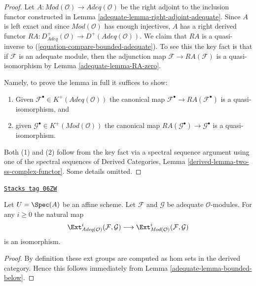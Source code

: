 \begin{proof}

Let $A : \textit{Mod}(\mathcal{O}) \to \textit{Adeq}(\mathcal{O})$
be the right adjoint to the inclusion functor constructed in
Lemma \ref{adequate-lemma-right-adjoint-adequate}.
Since $A$ is left exact and since $\textit{Mod}(\mathcal{O})$
has enough injectives, $A$ has a right derived functor
$RA : D^+_{\textit{Adeq}}(\mathcal{O}) \to D^+(\textit{Adeq}(\mathcal{O}))$.
We claim that $RA$ is a quasi-inverse to
(\ref{equation-compare-bounded-adequate}).
To see this the key fact is that if $\mathcal{F}$ is an adequate module, then
the adjunction map $\mathcal{F} \to RA(\mathcal{F})$ is a
quasi-isomorphism by Lemma \ref{adequate-lemma-RA-zero}.

\medskip\noindent
Namely, to prove the lemma in full it suffices to show:
\begin{enumerate}
\item Given $\mathcal{F}^\bullet \in K^+(\textit{Adeq}(\mathcal{O}))$
the canonical map $\mathcal{F}^\bullet \to RA(\mathcal{F}^\bullet)$
is a quasi-isomorphism, and
\item given $\mathcal{G}^\bullet \in K^+(\textit{Mod}(\mathcal{O}))$
the canonical map $RA(\mathcal{G}^\bullet) \to \mathcal{G}^\bullet$
is a quasi-isomorphism.
\end{enumerate}
Both (1) and (2) follow from the key fact via a spectral sequence
argument using one of the spectral sequences of
Derived Categories, Lemma \ref{derived-lemma-two-ss-complex-functor}.
Some details omitted.
\end{proof}

\begin{lemma}
\label{adequate-lemma-ext-adequate}
\href{https://stacks.math.columbia.edu/tag/06ZW}{\texttt{Stacks tag 06ZW}}

Let $U = \Spec(A)$ be an affine scheme.
Let $\mathcal{F}$ and $\mathcal{G}$ be adequate $\mathcal{O}$-modules.
For any $i \geq 0$ the natural map
$$
\Ext^i_{\textit{Adeq}(\mathcal{O})}(\mathcal{F}, \mathcal{G})
\longrightarrow
\Ext^i_{\textit{Mod}(\mathcal{O})}(\mathcal{F}, \mathcal{G})
$$
is an isomorphism.
\end{lemma}

\begin{proof}

By definition these ext groups are computed as hom sets in the
derived category. Hence this follows immediately from
Lemma \ref{adequate-lemma-bounded-below}.
\end{proof}

